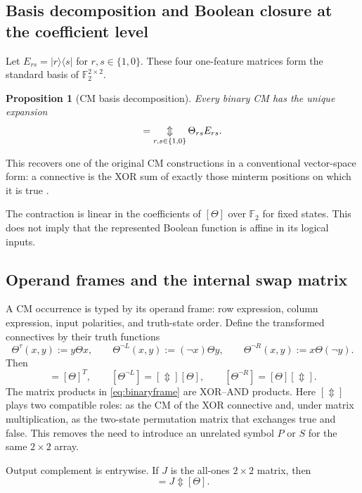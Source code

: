 \documentclass[11pt]{article}
\newtheorem{proposition}[theorem]{Proposition}
\theoremstyle{definition}
\theoremstyle{remark}
\newcommand{\F}{\mathbb F}
\newcommand{\xor}{\mathbin{\Updownarrow}}
\newcommand{\bigxor}{\mathop{\Updownarrow}\displaylimits}
\begin{document}
\subsection{Basis decomposition and Boolean closure at the coefficient level}

Let $E_{rs}=|r\rangle\langle s|$ for $r,s\in\{1,0\}$.  These four one-feature matrices form the standard basis of $\F_2^{2\times2}$.
\begin{proposition}[CM basis decomposition]
Every binary CM has the unique expansion
\begin{equation}
 [\Theta]=\bigxor_{r,s\in\{1,0\}}\Theta_{rs}E_{rs}.
 \label{eq:basisdecomp}
\end{equation}
\end{proposition}
This recovers one of the original CM constructions in a conventional vector-space form: a connective is the XOR sum of exactly those minterm positions on which it is true \cite{Droncheff2018}.

The contraction is linear in the coefficients of $[\Theta]$ over $\F_2$ for fixed states.  This does not imply that the represented Boolean function is affine in its logical inputs.

\subsection{Operand frames and the internal swap matrix}

A CM occurrence is typed by its operand frame: row expression, column expression, input polarities, and truth-state order.  Define the transformed connectives by their truth functions
\[
 \Theta^\tau(x,y):=y\Theta x,\qquad
 \Theta^{\neg L}(x,y):=(\neg x)\Theta y,\qquad
 \Theta^{\neg R}(x,y):=x\Theta(\neg y).
\]
Then
\begin{equation}
 [\Theta^\tau]=[\Theta]^T,\qquad
 [\Theta^{\neg L}]=[\Updownarrow][\Theta],\qquad
 [\Theta^{\neg R}]=[\Theta][\Updownarrow].
 \label{eq:binaryframe}
\end{equation}
The matrix products in \eqref{eq:binaryframe} are XOR--AND products.  Here $[\Updownarrow]$ plays two compatible roles: as the CM of the XOR connective and, under matrix multiplication, as the two-state permutation matrix that exchanges true and false.  This removes the need to introduce an unrelated symbol $P$ or $S$ for the same $2\times2$ array.

Output complement is entrywise.  If $J$ is the all-ones $2\times2$ matrix, then
\begin{equation}
 [\neg\Theta]=J\xor[\Theta].
 \label{eq:outputcomplement}
\end{equation}
\end{document}
